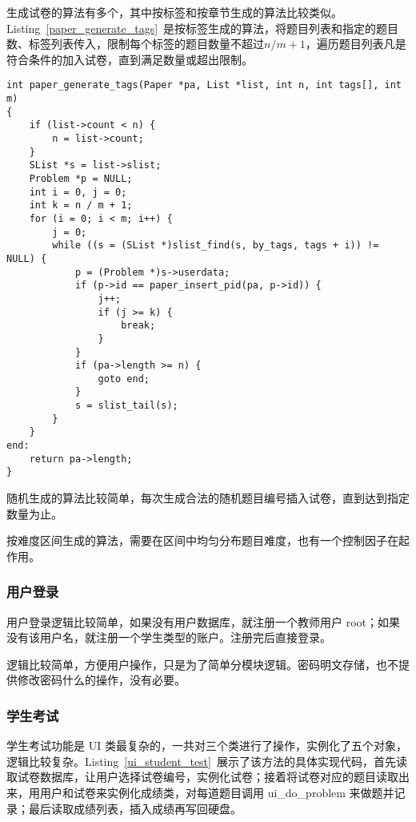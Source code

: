 生成试卷的算法有多个，其中按标签和按章节生成的算法比较类似。Listing~\ref{paper_generate_tags}~是按标签生成的算法，将题目列表和指定的题目数、标签列表传入，限制每个标签的题目数量不超过$n/m+1$，遍历题目列表凡是符合条件的加入试卷，直到满足数量或超出限制。

{\linespread{1}
\begin{lstlisting}[caption={\label{paper_generate_tags}paper\_generate\_tags()}]
int paper_generate_tags(Paper *pa, List *list, int n, int tags[], int m)
{
    if (list->count < n) {
        n = list->count;
    }
    SList *s = list->slist;
    Problem *p = NULL;
    int i = 0, j = 0;
    int k = n / m + 1;
    for (i = 0; i < m; i++) {
        j = 0;
        while ((s = (SList *)slist_find(s, by_tags, tags + i)) != NULL) {
            p = (Problem *)s->userdata;
            if (p->id == paper_insert_pid(pa, p->id)) {
                j++;
                if (j >= k) {
                    break;
                }
            }
            if (pa->length >= n) {
                goto end;
            }
            s = slist_tail(s);
        }
    }
end:
    return pa->length;
}
\end{lstlisting}
}

随机生成的算法比较简单，每次生成合法的随机题目编号插入试卷，直到达到指定数量为止。

按难度区间生成的算法，需要在区间中均匀分布题目难度，也有一个控制因子在起作用。

\subsubsection{用户登录}

用户登录逻辑比较简单，如果没有用户数据库，就注册一个教师用户 root；如果没有该用户名，就注册一个学生类型的账户。注册完后直接登录。

逻辑比较简单，方便用户操作，只是为了简单分模块逻辑。密码明文存储，也不提供修改密码什么的操作，没有必要。

\subsubsection{学生考试}

学生考试功能是 UI 类最复杂的，一共对三个类进行了操作，实例化了五个对象，逻辑比较复杂。Listing~\ref{ui_student_test}~展示了该方法的具体实现代码，首先读取试卷数据库，让用户选择试卷编号，实例化试卷；接着将试卷对应的题目读取出来，用用户和试卷来实例化成绩类，对每道题目调用 ui\_do\_problem 来做题并记录；最后读取成绩列表，插入成绩再写回硬盘。

